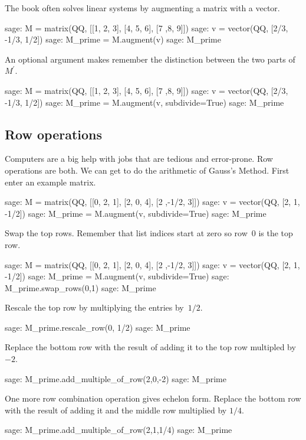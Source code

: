 The book often solves linear systems by augmenting a matrix with a vector.
\begin{sagecommandline}
sage: M = matrix(QQ, [[1, 2, 3], [4, 5, 6], [7 ,8, 9]])
sage: v = vector(QQ, [2/3, -1/3, 1/2])
sage: M_prime = M.augment(v)
sage: M_prime
\end{sagecommandline}
An optional argument makes 
\Sage{} remember the distinction between the two parts 
of $M^\prime$.
\begin{sagecommandline}
sage: M = matrix(QQ, [[1, 2, 3], [4, 5, 6], [7 ,8, 9]])
sage: v = vector(QQ, [2/3, -1/3, 1/2])
sage: M_prime = M.augment(v, subdivide=True)
sage: M_prime                              
\end{sagecommandline}



\subsection{Row operations}
Computers are a big help with jobs that are tedious and error-prone.
Row operations are both.
We can get \Sage{} to do the arithmetic of Gauss's Method.
First enter an example matrix.
\begin{sagecommandline}
sage: M = matrix(QQ, [[0, 2, 1], [2, 0, 4], [2 ,-1/2, 3]])
sage: v = vector(QQ, [2, 1, -1/2])                        
sage: M_prime = M.augment(v, subdivide=True)              
sage: M_prime                                             
\end{sagecommandline}
Swap the top rows. 
Remember that list indices start at zero
so row~$0$ is the top row.
\begin{sagecommandline}
sage: M = matrix(QQ, [[0, 2, 1], [2, 0, 4], [2 ,-1/2, 3]])
sage: v = vector(QQ, [2, 1, -1/2])                        
sage: M_prime = M.augment(v, subdivide=True)              
sage: M_prime.swap_rows(0,1)
sage: M_prime
\end{sagecommandline}
Rescale the top row by multiplying the entries by~$1/2$.
\begin{sagecommandline}
sage: M_prime.rescale_row(0, 1/2)
sage: M_prime
\end{sagecommandline}
Replace the bottom row with 
the result of adding it to  
the top row multipled by~$-2$.
\begin{sagecommandline}
sage: M_prime.add_multiple_of_row(2,0,-2)
sage: M_prime
\end{sagecommandline}
One more row combination operation gives echelon form.
Replace the bottom row with the result of adding it and
the middle row multiplied by $1/4$.
\begin{sagecommandline}
sage: M_prime.add_multiple_of_row(2,1,1/4)
sage: M_prime                             
\end{sagecommandline}

